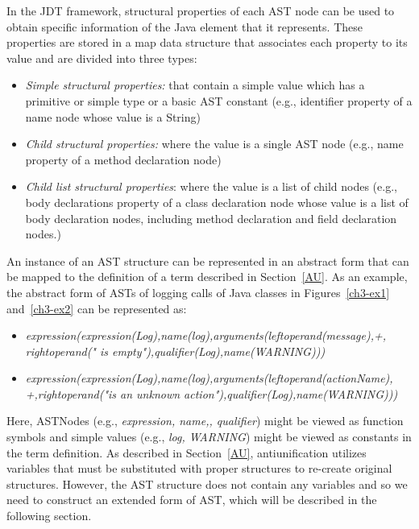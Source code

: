 In the JDT framework, structural properties of each AST node can be used to obtain specific information of the Java element that it represents. These properties are stored in a map data structure that associates each property to its value and are divided into three types:
\begin{itemize} [leftmargin=0.7in]
\item \textit{Simple structural properties:} that contain a simple value which has a primitive or simple type or a basic AST constant (e.g., identifier property of a name node whose value is a String)
\item \textit{Child structural properties:} where the value is a single AST node (e.g., name property of a method declaration node)
\item \textit{Child list structural properties}: where the value is a list of child nodes (e.g., body declarations property of a class declaration node whose value is a list of body declaration nodes, including method declaration and field declaration nodes.)
\end{itemize}
An instance of an AST structure can be represented in an abstract form that can be mapped to the definition of a term described in Section~\ref{AU}. As an example, the abstract form of ASTs of logging calls of Java classes in Figures~\ref{ch3-ex1} and~\ref{ch3-ex2} can be represented as:
\begin{itemize} [leftmargin=0.7in]
\item \textit{expression(expression(Log),name(log),arguments(leftoperand(message),+,\\rightoperand(" is empty"),qualifier(Log),name(WARNING)))}
\item \textit{expression(expression(Log),name(log),arguments(leftoperand(actionName),\\+,rightoperand("is an unknown action"),qualifier(Log),name(WARNING)))}
\end{itemize}

Here, ASTNodes (e.g., \textit{expression, name,, qualifier}) might be viewed as function symbols and simple values (e.g., \textit{log, WARNING}) might be viewed as constants in the term definition. As described in Section~\ref{AU}, antiunification utilizes variables that must be substituted with proper structures to re-create original structures. However, the AST structure does not contain any variables and so we need to construct an extended form of AST, which will be described in the following section.


